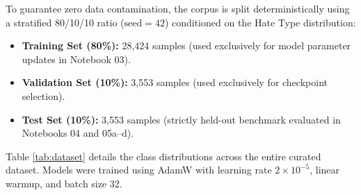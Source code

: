\documentclass[conference]{IEEEtran}
\begin{document}
To guarantee zero data contamination, the corpus is split deterministically using a stratified 80/10/10 ratio ($\text{seed} = 42$) conditioned on the Hate Type distribution:
\begin{itemize}
    \item \textbf{Training Set (80\%):} 28,424 samples (used exclusively for model parameter updates in Notebook 03).
    \item \textbf{Validation Set (10\%):} 3,553 samples (used exclusively for checkpoint selection).
    \item \textbf{Test Set (10\%):} 3,553 samples (strictly held-out benchmark evaluated in Notebooks 04 and 05a--d).
\end{itemize}

Table \ref{tab:dataset} details the class distributions across the entire curated dataset. Models were trained using AdamW \cite{loshchilov2017decoupled} with learning rate $2\times 10^{-5}$, linear warmup, and batch size 32.

\begin{table}[t]
\caption{Taxonomy Distribution Across All 35,530 Curated Samples}
\label{tab:dataset}
\begin{center}
\end{center}
\end{table}
\end{document}
